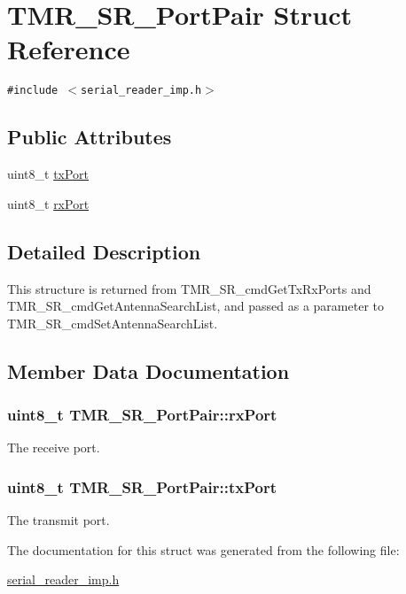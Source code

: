 \hypertarget{struct_t_m_r___s_r___port_pair}{
\section{TMR\_\-SR\_\-PortPair Struct Reference}
\label{struct_t_m_r___s_r___port_pair}
}
{\tt \#include $<$serial\_\-reader\_\-imp.h$>$}

\subsection*{Public Attributes}
\begin{CompactItemize}
\item 
uint8\_\-t \hyperlink{struct_t_m_r___s_r___port_pair_aad5d063a038848404299abe4d08155e}{txPort}
\item 
uint8\_\-t \hyperlink{struct_t_m_r___s_r___port_pair_15c651a7e54a279a7c97b3e71d318a78}{rxPort}
\end{CompactItemize}


\subsection{Detailed Description}
This structure is returned from TMR\_\-SR\_\-cmdGetTxRxPorts and TMR\_\-SR\_\-cmdGetAntennaSearchList, and passed as a parameter to TMR\_\-SR\_\-cmdSetAntennaSearchList. 

\subsection{Member Data Documentation}
\hypertarget{struct_t_m_r___s_r___port_pair_15c651a7e54a279a7c97b3e71d318a78}{
\subsubsection[{rxPort}]{\setlength{\rightskip}{0pt plus 5cm}uint8\_\-t {\bf TMR\_\-SR\_\-PortPair::rxPort}}}
\label{struct_t_m_r___s_r___port_pair_15c651a7e54a279a7c97b3e71d318a78}


The receive port. \hypertarget{struct_t_m_r___s_r___port_pair_aad5d063a038848404299abe4d08155e}{
\subsubsection[{txPort}]{\setlength{\rightskip}{0pt plus 5cm}uint8\_\-t {\bf TMR\_\-SR\_\-PortPair::txPort}}}
\label{struct_t_m_r___s_r___port_pair_aad5d063a038848404299abe4d08155e}


The transmit port. 

The documentation for this struct was generated from the following file:\begin{CompactItemize}
\item 
\hyperlink{serial__reader__imp_8h}{serial\_\-reader\_\-imp.h}\end{CompactItemize}
